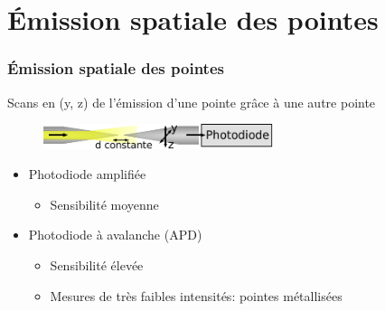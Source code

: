 \documentclass[9pt,a9paper,handout]{beamer}
\begin{document}
\section{Émission spatiale des pointes}
    \begin{frame}
        \frametitle{Émission spatiale des pointes}
        Scans en (y, z) de l'émission d'une pointe grâce à une autre pointe
        \begin{figure}[c]\centering
            \includegraphics[width=0.6\textwidth]{Images/Schemas/FibresScan}
        \end{figure}
        \vspace*{1mm}
        \begin{itemize}
            \item Photodiode amplifiée
            \begin{itemize} \item Sensibilité moyenne
            \end{itemize}
            \vspace*{1cm}
            \item Photodiode à avalanche (APD)
            \begin{itemize} \item Sensibilité élevée
                            \item Mesures de très faibles intensités: pointes métallisées
            \end{itemize}
        \end{itemize}
    \end{frame}
        
\end{document}
